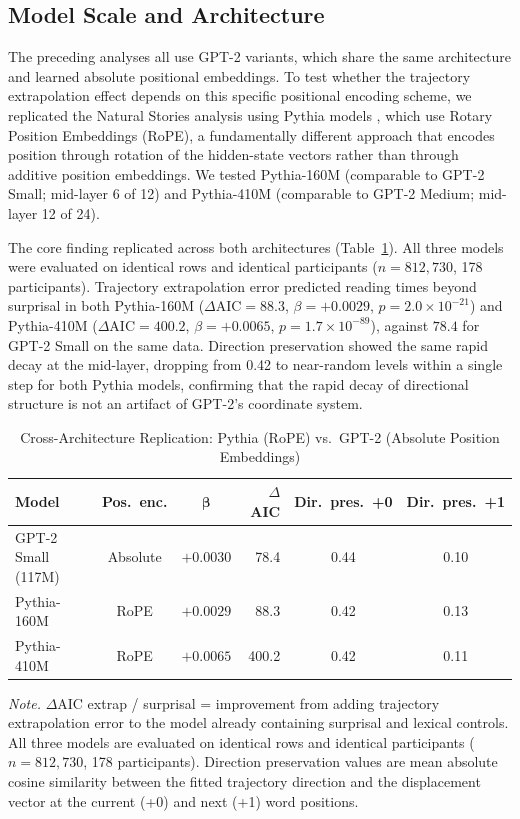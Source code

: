 \documentclass[12pt]{article}
\newcommand{\new}[1]{#1}   %
\begin{document}
\subsection{\new{Model Scale and Architecture}}

The preceding analyses all use GPT-2 variants, which share the same architecture and learned absolute positional embeddings. To test whether the trajectory extrapolation effect depends on this specific positional encoding scheme, we replicated the Natural Stories analysis using Pythia models \citep{biderman2023}, which use Rotary Position Embeddings (RoPE), a fundamentally different approach that encodes position through rotation of the hidden-state vectors rather than through additive position embeddings. We tested Pythia-160M (comparable to GPT-2 Small; mid-layer 6 of 12) and Pythia-410M (comparable to GPT-2 Medium; mid-layer 12 of 24).

The core finding replicated across both architectures (Table~\ref{tab:crossarch}). \new{All three models were evaluated on identical rows and identical participants ($n = 812{,}730$, 178 participants). Trajectory extrapolation error predicted reading times beyond surprisal in both Pythia-160M ($\Delta\text{AIC} = 88.3$, $\beta = +0.0029$, $p = 2.0 \times 10^{-21}$) and Pythia-410M ($\Delta\text{AIC} = 400.2$, $\beta = +0.0065$, $p = 1.7 \times 10^{-89}$), against $78.4$ for GPT-2 Small on the same data.} Direction preservation showed the same rapid decay at the mid-layer, dropping from 0.42 to near-random levels within a single step for both Pythia models, confirming that the \new{rapid decay of directional structure} is not an artifact of GPT-2's coordinate system.

\begin{table}[!htbp]
\centering
\caption{Cross-Architecture Replication: Pythia (RoPE) vs.\ GPT-2 (Absolute Position Embeddings)}
\label{tab:crossarch}
\begin{tabular}{lccrcc}
\toprule
\textbf{Model} & \textbf{Pos.\ enc.} & \new{$\boldsymbol{\beta}$} & \textbf{$\Delta$AIC} & \textbf{Dir.\ pres.\ +0} & \textbf{Dir.\ pres.\ +1} \\
\midrule
GPT-2 Small (117M) & Absolute & \new{$+0.0030$} & \new{78.4} & 0.44 & 0.10 \\
Pythia-160M & RoPE & \new{$+0.0029$} & \new{88.3} & 0.42 & 0.13 \\
Pythia-410M & RoPE & \new{$+0.0065$} & \new{400.2} & 0.42 & 0.11 \\
\bottomrule
\end{tabular}

\smallskip
\footnotesize
\textit{Note.} $\Delta$AIC extrap / surprisal = improvement from adding trajectory extrapolation error to the model already containing surprisal and lexical controls. \new{All three models are evaluated on identical rows and identical participants ($n = 812{,}730$, 178 participants).} Direction preservation values are mean absolute cosine similarity between the fitted trajectory direction and the displacement vector at the current (+0) and next (+1) word positions.
\end{table}
\end{document}
